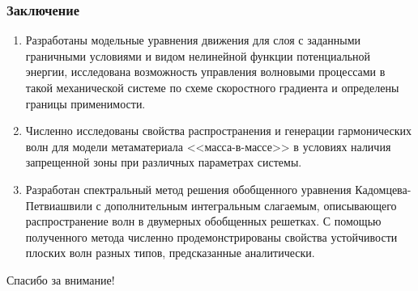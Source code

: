 \begin{frame}
	\frametitle{Заключение}
	\begin{enumerate}
		\item Разработаны модельные уравнения движения для слоя с заданными граничными условиями и видом нелинейной функции потенциальной энергии, исследована возможность управления волновыми процессами в такой механической системе по схеме скоростного градиента и определены границы применимости.   
		\item Численно исследованы свойства распространения и генерации гармонических волн для модели метаматериала <<масса-в-массе>> в условиях наличия запрещенной зоны при различных параметрах системы.  
		\item Разработан спектральный метод решения обобщенного уравнения Кадомцева-Петвиашвили с дополнительным интегральным слагаемым, описывающего распространение волн в двумерных обобщенных решетках. С помощью полученного метода численно продемонстрированы свойства устойчивости плоских волн разных типов, предсказанные аналитически. 
	\end{enumerate}
\end{frame}

\begin{frame} %
	\begin{center}
		\Huge
		Спасибо за внимание!
	\end{center}
\end{frame}

